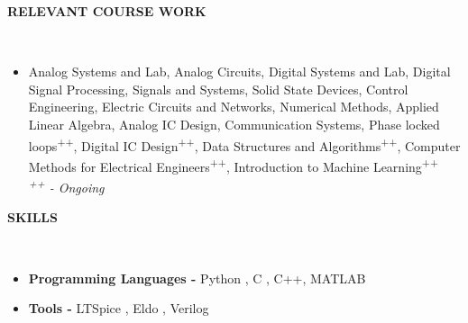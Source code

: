 \documentclass[a4paper,8pt]{article}
\newcommand{\lsep}{-0.5cm}
\newcommand{\resheading}[1]{{\small \colorbox{mygrey}{\begin{minipage}{0.975\textwidth}{\textbf{#1 \vphantom{p\^{E}}}}\end{minipage}}}}
\begin{document}
\resheading{\textbf{RELEVANT COURSE WORK} }\\[\lsep]
\vspace{0.6mm}
\begin{itemize}
    \item Analog Systems and Lab, Analog Circuits, Digital Systems and Lab, Digital Signal Processing, Signals and Systems, Solid State Devices, Control Engineering, Electric Circuits and Networks, Numerical Methods, Applied Linear Algebra, Analog IC Design, Communication Systems, Phase locked loops\textsuperscript{++}, Digital IC Design\textsuperscript{++}, Data Structures and Algorithms\textsuperscript{++}, Computer Methods for Electrical Engineers\textsuperscript{++}, Introduction to Machine Learning\textsuperscript{++}\\
    \hspace*{\fill} \emph{\textsuperscript{++} - Ongoing }
    \end{itemize}

\resheading{\textbf{SKILLS} }\\[\lsep]
\vspace{1mm}
\begin{itemize}
\item \noindent \textbf{Programming Languages - } Python , C , C++, MATLAB
\item \noindent \textbf{Tools - } LTSpice , Eldo , Verilog
\end{itemize}
\end{document}
